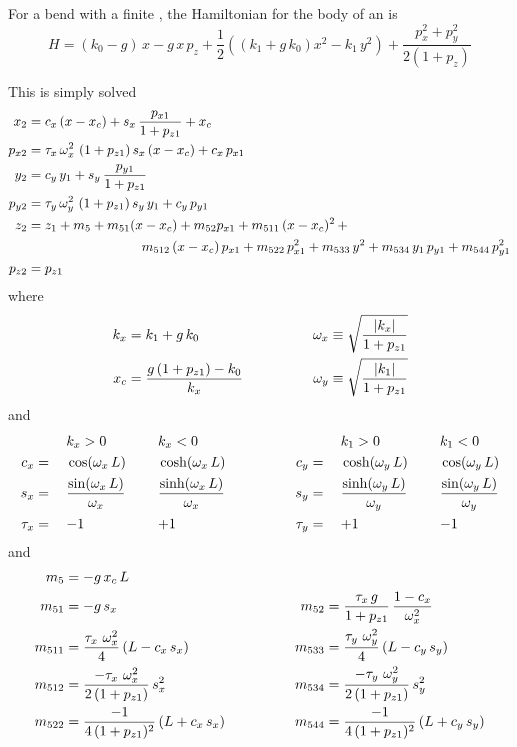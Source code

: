 For a bend with a finite , the Hamiltonian for the body of an  is
\begin{equation}
  H = (k_0 - g) \, x - g \, x \, p_z + 
  \frac{1}{2}\left( (k_1 + g \, k_0) x^2 - k_1 \, y^2 \right) +
  \frac{p_x^2 + p_y^2}{2 (1 + p_z)} 
\end{equation}

This is simply solved
\begin{align}
  x_2    &= c_x \, (x - x_c) + s_x \, \frac{p_{x1}}{1 + p_{z1}} + x_c \CRNO
  p_{x2} &= \tau_x \, \om_x^2 \, \, (1 + p_{z1}) \, s_x \, (x -x_c) + c_x \, p_{x1} \CRNO
  y_2    &= c_y \, y_1 + s_y \, \frac{p_{y1}}{1 + p_{z1}} \CRNO
  p_{y2} &= \tau_y \, \om_y^2 \, \, (1 + p_{z1}) \, s_y \, y_1 + c_y \, p_{y1} \\
  z_2    &= z_1 + m_5 + m_{51} (x - x_c) + m_{52} p_{x1} + m_{511} \, (x-x_c)^2 \, + \CRNO
         &\hspace*{20ex} m_{512} \, (x-x_c) \, p_{x1} + m_{522} \, p_{x1}^2 + 
                         m_{533} \, y^2 + m_{534} \, y_1 \, p_{y1} + m_{544} \, p_{y1}^2 \CRNO
  p_{z2} &= p_{z1} \nonumber
\end{align}
where 
\begin{alignat}{2}
  k_x &= k_1 + g \, k_0 & \qquad \qquad
  \omega_x &\equiv \sqrt{\frac{|k_x|}{1 + p_{z1}}} \nonumber \\
  x_c &= \frac{g \, (1 + p_{z1}) - k_0}{k_x} & \qquad \qquad
  \omega_y &\equiv \sqrt{\frac{|k_1|}{1 + p_{z1}}} 
\end{alignat}
and
\begin{alignat}{6}
         &\hspace*{3ex}  && k_x > 0          &\hspace*{3ex}& k_x < 0 & \qquad \qquad
         &\hspace*{3ex}  && k_1 > 0          &\hspace*{3ex}& k_1 < 0 \nonumber \\
     c_x &=   && \cos  (\omega_x \, L)               && \cosh (\omega_x \, L) & \qquad \qquad
     c_y &=   && \cosh (\omega_y \, L)               && \cos  (\omega_y \, L) \nonumber \\
     s_x &=   && \frac{\sin  (\omega_x \, L)}{\omega_x} && \frac{\sinh (\omega_x \, L)}{\omega_x} & \qquad \qquad
     s_y &=   && \frac{\sinh (\omega_y \, L)}{\omega_y} && \frac{\sin  (\omega_y \, L)}{\omega_y} \\
  \tau_x &=   && {-}1             && {+}1             & \qquad \qquad
  \tau_y &=   && {+}1             && {-}1             \nonumber
\end{alignat}
and
\begin{alignat}{2}
  m_5     &= -g \, x_c \, L & \qquad \qquad & \nonumber \\
  m_{51}  &= -g \, s_x & \qquad \qquad
  m_{52}  &= \frac{\tau_x \, g}{1 + p_{z1}} \, \frac{1 - c_x}{\omega_x^2} \nonumber \\
  m_{511} &= \frac{\tau_x \,\, \omega_x^2}{4} \, (L - c_x \, s_x) & \qquad \qquad
  m_{533} &= \frac{\tau_y \,\, \omega_y^2}{4} \, (L - c_y \, s_y) \nonumber \\
  m_{512} &= \frac{-\tau_x \,\, \omega_x^2}{2 \, (1 + p_{z1})} \, s_x^2 & \qquad \qquad
  m_{534} &= \frac{-\tau_y \,\, \omega_y^2}{2 \, (1 + p_{z1})} \, s_y^2 \nonumber \\
  m_{522} &= \frac{-1}{4 \, (1 + p_{z1})^2} \, (L + c_x \, s_x) & \qquad \qquad
  m_{544} &= \frac{-1}{4 \, (1 + p_{z1})^2} \, (L + c_y \, s_y) \nonumber
\end{alignat}

